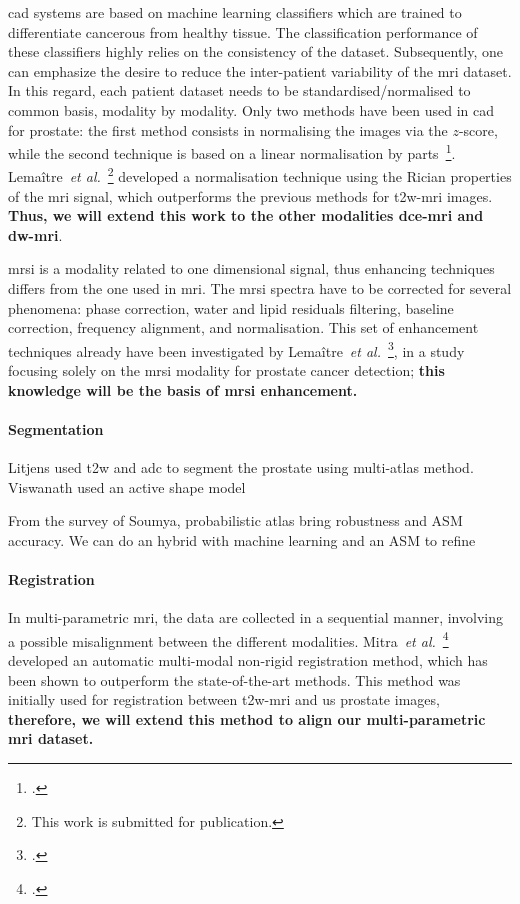 \ac{cad} systems are based on machine learning classifiers which are trained to differentiate cancerous from healthy tissue.
The classification performance of these classifiers highly relies on the consistency of the dataset.
Subsequently, one can emphasize the desire to reduce the inter-patient variability of the \ac{mri} dataset.
In this regard, each patient dataset needs to be standardised/normalised to common basis, modality by modality.
Only two methods have been used in \ac{cad} for prostate: the first method consists in normalising the images via the $z$-score, while the second technique is based on a linear normalisation by parts~\footcite{Madabhushi2006a}.
Lema\^itre~\emph{et al.}~\footnote{This work is submitted for publication.} developed a normalisation technique using the Rician properties of the \ac{mri} signal, which outperforms the previous methods for \ac{t2w}-\ac{mri} images.
\textbf{Thus, we will extend this work to the other modalities \ac{dce}-\ac{mri} and \ac{dw}-\ac{mri}}.

\ac{mrsi} is a modality related to one dimensional signal, thus enhancing techniques differs from the one used in \ac{mri}.
The \ac{mrsi} spectra have to be corrected for several phenomena: phase correction, water and lipid residuals filtering, baseline correction, frequency alignment, and normalisation.
This set of enhancement techniques already have been investigated by Lema\^itre~\emph{et al.}~\footcite{Lemaitre2011}, in a study focusing solely on the \ac{mrsi} modality for prostate cancer detection; \textbf{this knowledge will be the basis of \ac{mrsi} enhancement.}

\paragraph{Segmentation}

Litjens used t2w and adc to segment the prostate using multi-atlas method.
Viswanath used an active shape model

From the survey of Soumya, probabilistic atlas bring robustness and ASM accuracy.
We can do an hybrid with machine learning and an ASM to refine

\paragraph{Registration}

In multi-parametric \ac{mri}, the data are collected in a sequential manner, involving a possible misalignment between the different modalities.
Mitra~\emph{et al.}~\footcite{Mitra2012a} developed an automatic multi-modal non-rigid registration method, which has been shown to outperform the state-of-the-art methods.
This method was initially used for registration between \ac{t2w}-\ac{mri} and \ac{us} prostate images, \textbf{therefore, we will extend this method to align our multi-parametric \ac{mri} dataset.}

